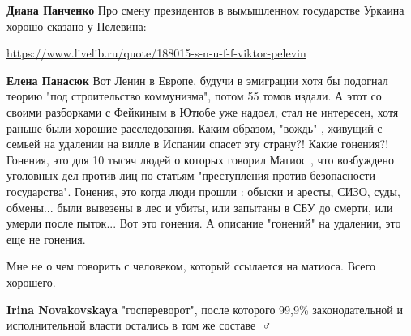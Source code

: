 \begin{itemize}
\begin{itemize}
\textbf{Диана Панченко} Про смену президентов в вымышленном государстве Уркаина хорошо сказано у Пелевина:

\url{https://www.livelib.ru/quote/188015-s-n-u-f-f-viktor-pelevin}

 
\textbf{Елена Панасюк} Вот Ленин в Европе, будучи в эмиграции хотя бы подогнал
теорию "под строительство коммунизма", потом 55 томов издали. А этот со своими
разборками с Фейкиным в Ютюбе уже надоел, стал не интересен, хотя раньше были
хорошие расследования. Каким образом, "вождь" , живущий с семьей на удалении на
вилле в Испании спасет эту страну?! Какие гонения?! Гонения, это для 10 тысяч
людей о которых говорил Матиос , что возбуждено уголовных дел против лиц по
статьям "преступления против безопасности государства". Гонения, это когда люди
прошли : обыски и аресты, СИЗО, суды, обмены... были вывезены в лес и убиты,
или запытаны в СБУ до смерти, или умерли после пыток... Вот это гонения. А
описание "гонений" на удалении, это еще не гонения.

 

Мне не о чем говорить с человеком, который ссылается на матиоса. Всего
хорошего.

 
\textbf{Irina Novakovskaya} "госпереворот", после которого 99,9\% законодательной и исполнительной власти остались в том же составе
\Laughey[1.0][white]\Laughey[1.0][white]🤦♂️

 

\end{itemize}
\end{itemize}
